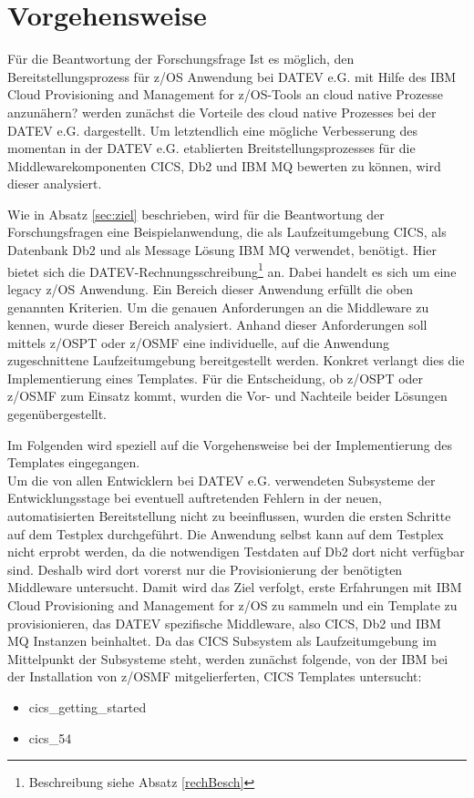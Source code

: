 \chapter{Vorgehensweise}\label{ch:vorgehensweise}
Für die Beantwortung der Forschungsfrage \glqq Ist es möglich, den Bereitstellungsprozess für z/OS Anwendung bei DATEV e.G. mit Hilfe des \glqq IBM Cloud Provisioning and Management for z/OS\grqq-Tools an cloud native Prozesse anzunähern?\grqq{} werden zunächst die Vorteile des cloud native Prozesses bei der DATEV e.G. dargestellt.
Um letztendlich eine mögliche Verbesserung des momentan in der DATEV e.G. etablierten Breitstellungsprozesses für die Middlewarekomponenten CICS, Db2 und IBM MQ bewerten zu können, wird dieser analysiert.

Wie in Absatz \ref{sec:ziel} beschrieben, wird für die Beantwortung der Forschungsfragen eine Beispielanwendung, die als Laufzeitumgebung CICS, als Datenbank Db2 und als Message Lösung IBM MQ verwendet, benötigt.
Hier bietet sich die \glqq DATEV-Rechnungsschreibung\grqq{}\footnote{Beschreibung siehe Absatz \ref{rechBesch}} an.
Dabei handelt es sich um eine legacy z/OS Anwendung. Ein Bereich dieser Anwendung erfüllt die oben genannten Kriterien.
Um die genauen Anforderungen an die Middleware zu kennen, wurde dieser Bereich analysiert.
Anhand dieser Anforderungen soll mittels z/OSPT oder z/OSMF eine individuelle, auf die Anwendung zugeschnittene Laufzeitumgebung bereitgestellt werden.
Konkret verlangt dies die Implementierung eines Templates.
Für die Entscheidung, ob z/OSPT oder z/OSMF zum Einsatz kommt, wurden die Vor- und Nachteile beider Lösungen gegenübergestellt.

Im Folgenden wird speziell auf die Vorgehensweise bei der Implementierung des Templates eingegangen.\\
Um die von allen Entwicklern bei DATEV e.G. verwendeten Subsysteme der Entwicklungsstage bei eventuell auftretenden Fehlern in der neuen, automatisierten Bereitstellung nicht zu beeinflussen, wurden die ersten Schritte auf dem Testplex durchgeführt.
Die Anwendung selbst kann auf dem Testplex nicht erprobt werden, da die notwendigen Testdaten auf Db2 dort nicht verfügbar sind.
Deshalb wird dort vorerst nur die Provisionierung der benötigten Middleware untersucht.
Damit wird das Ziel verfolgt, erste Erfahrungen mit \glqq IBM Cloud Provisioning and Management for z/OS\grqq{} zu sammeln und ein Template zu provisionieren, das DATEV spezifische Middleware, also CICS, Db2 und IBM MQ Instanzen beinhaltet. 
Da das CICS Subsystem als Laufzeitumgebung im Mittelpunkt der Subsysteme steht, werden zunächst folgende, von der IBM bei der Installation von z/OSMF mitgelierferten, CICS Templates untersucht:
\begin{itemize}
\item \glqq cics\_getting\_started\grqq
\item \glqq cics\_54\grqq
\end{itemize}

